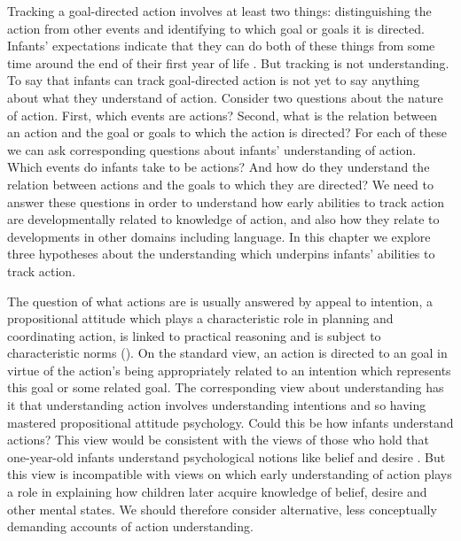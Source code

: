 \documentclass[12pt,\papersize]{extarticle}
\begin{document}
Tracking a goal-directed action involves at least two things: distinguishing the action from other events 
and
identifying to which goal or goals it is directed.
Infants' expectations indicate that they can do both of these things from some time around the end of their first year of life \citep[e.g.][]{Csibra:2003kp}. 
But tracking is not understanding.
To say that infants can track goal-directed action is not yet to say anything about what they understand of action.
Consider two questions about the nature of action.
First, which events are actions?
Second, what is the relation between an action and the goal or goals to which the action is directed?
For each of these we can ask corresponding questions about infants' understanding of action.
Which events do infants take to be actions?
And how do they understand the relation between actions and the goals to which they are directed?
We need to answer these questions in order to understand how early abilities to track action are developmentally related to knowledge of action, and also how they relate to developments in other domains including language.
In this chapter we explore three hypotheses about the understanding which underpins infants' abilities to track action.


The question of what actions are is usually answered by appeal to intention, a propositional attitude which plays a characteristic role in planning and coordinating action, is linked to practical reasoning and is subject to characteristic norms (\citealp{Bratman:1987xw}).  
On the standard view, an action is directed to an goal in virtue of the action's being appropriately related to an intention which represents this goal or some related goal.
The corresponding view about understanding has it that 
understanding action involves understanding intentions and so having mastered propositional attitude psychology.
Could this be how infants understand actions?
This view would be consistent with the views of those who hold that one-year-old infants understand psychological notions like belief and desire \citep{Baillargeon:gx}.
But this view is incompatible with  views on which early understanding of action plays a role in explaining how children later acquire knowledge of belief, desire and other mental states.
We should therefore consider alternative, less conceptually demanding accounts of action understanding.
\end{document}
